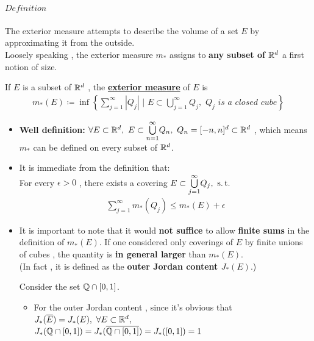 \paragraph{$Definition$}
	The exterior measure attempts to describe the volume of a set $E$ by approximating it from the outside.\\ Loosely speaking , the exterior measure $m_{*}$ assigns to \textbf{any subset of $\mathbb{R}^d$} a first notion of size.
	\begin{defn}\label{def 1.2.1}
		If $E$ is a subset of $\mathbb{R}^d$ , the \underline{\textbf{exterior measure}} of $E$ is
		\begin{align}
			m_{*}(E) \coloneqq \inf{ \left\{ \sum_{j = 1}^{\infty}{\left| Q_j \right| \,\, \Big| \,\, E \subset \bigcup_{j = 1}^{\infty}{Q_j} , \,\, Q_j \,\, is \,\, a \,\, closed \,\, cube } \right\} }
		\end{align}
	
		\begin{rmk}
			\begin{itemize}
				\item \textbf{Well definition:}  $\forall E \subset \mathbb{R}^d , \,\, E \subset \overset{\infty}{\underset{n = 1}{\bigcup}}{Q_n} , \,\, Q_n = [-n , n]^d \subset \mathbb{R}^d$ , which means $m_{*}$ can be defined on every subset of $\mathbb{R}^d$.
				
				\item It is immediate from the definition that:\\
				For every $\epsilon > 0$ , there exists a covering $E \subset \overset{\infty}{\underset{j = 1}{\bigcup}}{Q_j} , \,\, \operatorname{s.t.}$
				\begin{align}
					\sum_{j = 1}^{\infty}{m_{*}(Q_j)} \leq m_{*}(E) + \epsilon
				\end{align}
				
				\item It is important to note that it would \textbf{not suffice} to allow \textbf{finite sums} in the definition of $m_{*}(E)$. If one considered only coverings of $E$ by finite unions of cubes , the quantity is \textbf{in general larger} than $m_{*}(E)$.\\
				(In fact , it is defined as the \textbf{outer Jordan content $J_{*}(E)$}.)
				\begin{example}\label{ex 1.2.1}
					Consider the set $\mathbb{Q} \cap [0 , 1]$.
					\begin{itemize}
						\item For the outer Jordan content , since it's obvious that $J_{*}(\overline{E}) = J_{*}(E) , \,\, \forall E \subset \mathbb{R}^d , $\\
						$J_{*}(\mathbb{Q} \cap [0 , 1]) = J_{*}(\overline{\mathbb{Q} \cap [0 , 1]}) = J_{*}([0 , 1]) = 1$
						

\end{itemize}
\end{example}
\end{itemize}
\end{rmk}
\end{defn}
